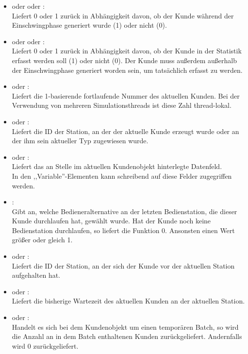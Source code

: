 \begin{itemize}

\item
{} oder  oder :\\
Liefert 0 oder 1 zurück in Abhängigkeit davon, ob der Kunde während der Einschwingphase generiert wurde (1) oder nicht (0).

\item
{} oder  oder :\\
Liefert 0 oder 1 zurück in Abhängigkeit davon, ob der Kunde in der Statistik erfasst werden soll (1) oder nicht (0). Der Kunde muss außerdem außerhalb der Einschwingphase generiert worden sein, um tatsächlich erfasst zu werden.

\item
{} oder :\\
Liefert die 1-basierende fortlaufende Nummer des aktuellen Kunden. Bei der Verwendung von mehreren Simulationsthreads ist diese Zahl thread-lokal.

\item
{} oder :\\
Liefert die ID der Station, an der der aktuelle Kunde erzeugt wurde oder an der ihm sein aktueller Typ zugewiesen wurde.

\item
{} oder :\\
Liefert das an Stelle  im aktuellen Kundenobjekt hinterlegte Datenfeld.\\
In den ,,Variable''-Elementen kann schreibend auf diese Felder zugegriffen werden.

\item
{}:\\
Gibt an, welche Bedieneralternative an der letzten Bedienstation, die dieser Kunde durchlaufen hat, gewählt wurde. Hat der Kunde noch keine Bedienstation durchlaufen, so liefert die Funktion 0. Ansonsten einen Wert größer oder gleich 1.

\item
{} oder :\\
Liefert die ID der Station, an der sich der Kunde vor der aktuellen Station aufgehalten hat.

\item
{} oder :\\
Liefert die bisherige Wartezeit des aktuellen Kunden an der aktuellen Station.

\item
{} oder :\\
Handelt es sich bei dem Kundenobjekt um einen temporären Batch, so wird die Anzahl an in dem Batch enthaltenen Kunden zurückgeliefert. Andernfalls wird 0 zurückgeliefert.

\end{itemize}



